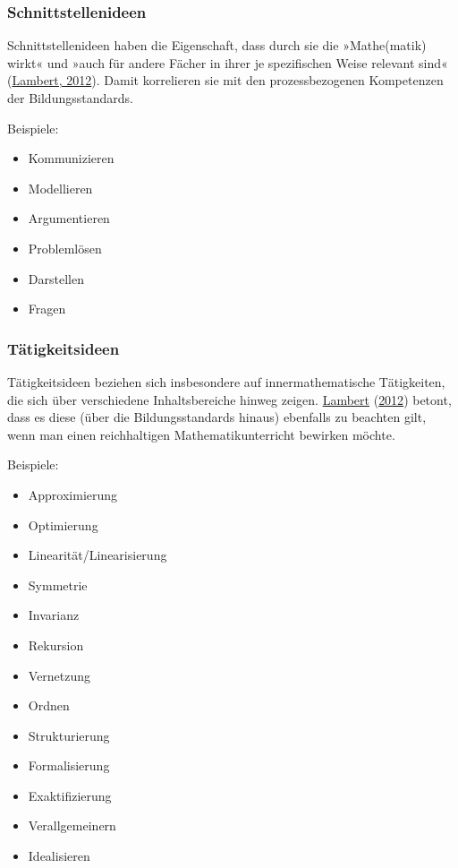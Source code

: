 \documentclass[
  ngerman,
]{scrbook}
\providecommand{\tightlist}{%
  \setlength{\itemsep}{0pt}\setlength{\parskip}{0pt}}
\theoremstyle{definition}
\theoremstyle{definition}
\theoremstyle{definition}
\theoremstyle{definition}
\theoremstyle{remark}
\begin{document}
\hypertarget{schnittstellenideen}{%
\subsubsection{Schnittstellenideen}\label{schnittstellenideen}}

Schnittstellenideen haben die Eigenschaft, dass durch sie die »Mathe(matik) wirkt« und »auch für andere Fächer in ihrer je spezifischen Weise relevant sind« (\protect\hyperlink{ref-Lambert:2012}{Lambert, 2012}). Damit korrelieren sie mit den prozessbezogenen Kompetenzen der Bildungsstandards.

Beispiele:

\begin{itemize}
\tightlist
\item
  Kommunizieren
\item
  Modellieren
\item
  Argumentieren
\item
  Problemlösen
\item
  Darstellen
\item
  Fragen
\end{itemize}

\hypertarget{taetigkeitsideen}{%
\subsubsection{Tätigkeitsideen}\label{taetigkeitsideen}}

Tätigkeitsideen beziehen sich insbesondere auf innermathematische Tätigkeiten, die sich über verschiedene Inhaltsbereiche hinweg zeigen. \protect\hyperlink{ref-Lambert:2012}{Lambert} (\protect\hyperlink{ref-Lambert:2012}{2012}) betont, dass es diese (über die Bildungsstandards hinaus) ebenfalls zu beachten gilt, wenn man einen reichhaltigen Mathematikunterricht bewirken möchte.

Beispiele:

\begin{itemize}
\tightlist
\item
  Approximierung
\item
  Optimierung
\item
  Linearität/Linearisierung
\item
  Symmetrie
\item
  Invarianz
\item
  Rekursion
\item
  Vernetzung
\item
  Ordnen
\item
  Strukturierung
\item
  Formalisierung
\item
  Exaktifizierung
\item
  Verallgemeinern
\item
  Idealisieren
\end{itemize}
\end{document}

